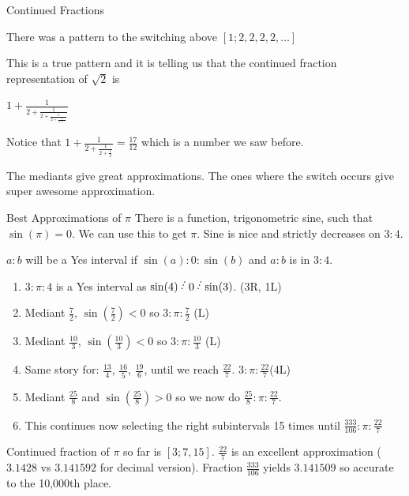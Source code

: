 \documentclass{beamer}
\begin{document}
\begin{frame}{Continued Fractions}

There was a pattern to the switching above $[1; 2, 2, 2, 2, \ldots ]$

This is a true pattern and it is telling us that the continued fraction representation of $\sqrt{2}$ is

$1 + \frac{1}{2 + \frac{1}{2 + \frac{1}{2 + \frac{1}{2 + \ldots}}}}$

Notice that $1 + \frac{1}{2 + \frac{1}{2 + \frac{1}{2}}} = \frac{17}{12}$  which is a number we saw before. 

The mediants give great approximations. The ones where the switch occurs give super awesome approximation. 

\end{frame}

\begin{frame}{Best Approximations of $\pi$}
    There is a function, trigonometric sine, such that $\sin(\pi) = 0$. We can use this to get $\pi$. Sine is nice and strictly decreases on $3:4$. 

    $a:b$ will be a Yes interval if  $\sin(a):0:\sin(b)$ and $a:b$ is in $3:4$.

    \begin{enumerate}
        \item $3:\pi:4$ is a Yes interval as $\sin(4) \lte  0 \lte \sin(3)$. (3R, 1L)
        \item Mediant $\frac{7}{2}$, $\sin(\frac{7}{2}) < 0$ so $3:\pi:\frac{7}{2}$ (L)
        \item Mediant $\frac{10}{3}$, $\sin(\frac{10}{3}) < 0$ so $3:\pi:\frac{10}{3}$ (L)
        \item Same story for: $\frac{13}{4}$, $\frac{16}{5}$, $\frac{19}{6}$, until we reach $\frac{22}{7}$. $3:\pi:\frac{22}{7}$(4L)
        \item Mediant $\frac{25}{8}$ and $\sin(\frac{25}{8}) > 0$ so we now do $\frac{25}{8}:\pi:\frac{22}{7}$.
        \item This continues now selecting the right subintervals 15 times until $\frac{333}{106}:\pi:\frac{22}{7}$ 
    \end{enumerate}

    Continued fraction of $\pi$ so far is $[3; 7, 15]$. $\frac{22}{7}$ is an excellent approximation ($3.1428$ vs $3.141592$ for decimal version). Fraction $\frac{333}{106}$ yields $3.141509$ so accurate to the 10,000th place.  

\end{frame}
\end{document}
